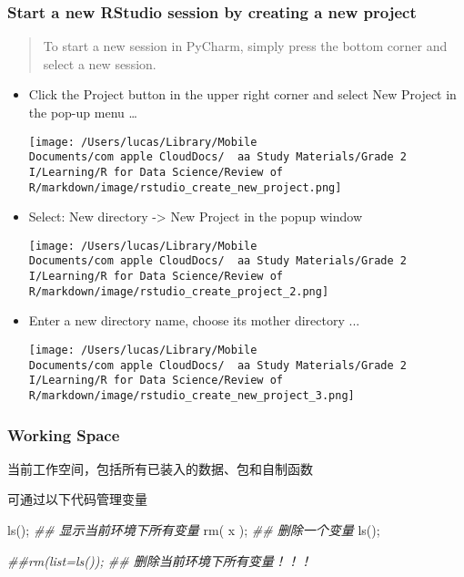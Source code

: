 \documentclass[
]{article}
\let\oldincludegraphics\includegraphics
\renewcommand{\includegraphics}[2][]{\begin{center}\oldincludegraphics[#1]{#2}\end{center}}
\newenvironment{Shaded}{}{}
\newcommand{\DocumentationTok}[1]{\textcolor[rgb]{0.73,0.13,0.13}{\textit{#1}}}
\newcommand{\FunctionTok}[1]{\textcolor[rgb]{0.02,0.16,0.49}{#1}}
\newcommand{\NormalTok}[1]{#1}
\begin{document}
\hypertarget{start-a-new-rstudio-session-by-creating-a-new-project}{%
\subsubsection{Start a new RStudio session by creating a new
project}\label{start-a-new-rstudio-session-by-creating-a-new-project}}

\begin{quote}
To start a new session in PyCharm, simply press the bottom corner and
select a new session.
\end{quote}

\begin{itemize}
\item
  Click the Project button in the upper right corner and select New
  Project in the pop-up menu \ldots{}

  \texttt{[image: /Users/lucas/Library/Mobile Documents/com~apple~CloudDocs/~~aa Study Materials/Grade 2 I/Learning/R for Data Science/Review of R/markdown/image/rstudio\_create\_new\_project.png]}
\item
  Select: New directory -\textgreater{} New Project in the popup window

  \texttt{[image: /Users/lucas/Library/Mobile Documents/com~apple~CloudDocs/~~aa Study Materials/Grade 2 I/Learning/R for Data Science/Review of R/markdown/image/rstudio\_create\_project\_2.png]}
\item
  Enter a new directory name, choose its mother directory ...

  \texttt{[image: /Users/lucas/Library/Mobile Documents/com~apple~CloudDocs/~~aa Study Materials/Grade 2 I/Learning/R for Data Science/Review of R/markdown/image/rstudio\_create\_new\_project\_3.png]}
\end{itemize}

\hypertarget{working-space}{%
\subsubsection{Working Space}\label{working-space}}

当前工作空间，包括所有已装入的数据、包和自制函数

可通过以下代码管理变量

\begin{Shaded}
\begin{Highlighting}[]
\FunctionTok{ls}\NormalTok{();  }\DocumentationTok{\#\# 显示当前环境下所有变量}
\FunctionTok{rm}\NormalTok{( x ); }\DocumentationTok{\#\# 删除一个变量}
\FunctionTok{ls}\NormalTok{(); }

\DocumentationTok{\#\#rm(list=ls()); \#\# 删除当前环境下所有变量！！！ }
\end{Highlighting}
\end{Shaded}
\end{document}
